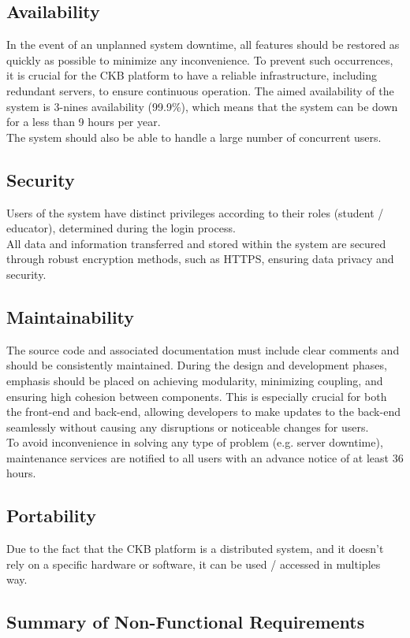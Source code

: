 \subsection{Availability}
In the event of an unplanned system downtime, all features should be restored as quickly as possible to minimize any inconvenience. To prevent such occurrences, it is crucial for the CKB platform to have a reliable infrastructure, including redundant servers, to ensure continuous operation.
The aimed availability of the system is 3-nines availability (99.9\%), which means that the system can be down for a less than 9 hours per year.\\
The system should also be able to handle a large number of concurrent users.

\subsection{Security}
Users of the system have distinct privileges according to their roles (student / educator), determined during the login process.\\
All data and information transferred and stored within the system are secured through robust encryption methods, such as HTTPS, ensuring data privacy and security.

\subsection{Maintainability}
The source code and associated documentation must include clear comments and should be consistently maintained. During the design and development phases, emphasis should be placed on achieving modularity, minimizing coupling, and ensuring high cohesion between components.
This is especially crucial for both the front-end and back-end, allowing developers to make updates to the back-end seamlessly without causing any disruptions or noticeable changes for users.\\
To avoid inconvenience in solving any type of problem (e.g. server downtime), maintenance services are notified to all users with an advance notice of at least 36 hours.

\subsection{Portability}
Due to the fact that the CKB platform is a distributed system, and it doesn't rely on a specific hardware or software, it can be used / accessed in multiples way.

    {\color{red}\subsection*{Summary of Non-Functional Requirements}}

